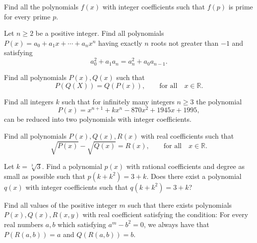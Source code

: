 \documentclass[12pt,a4paper]{memoir}
\theoremstyle{definition}
\begin{document}
\begin{question}
	Find all the polynomials $f(x)$ with integer coefficients such that $f(p)$ is prime for every prime $p.$
\end{question}





\begin{question}
	Let $ n \geq 2$ be a positive integer. Find all polynomials $ P(x)=a_0 +a_1 x +\cdots + a_{n} x^n$ having exactly $ n$ roots not greater than $-1$ and satisfying
	\[ a^2_0+ a_1 a_n = a^2_n +a_0 a_{n-1}.\]
\end{question}





\begin{question}
	Find all polynomials  $ P(x),Q(x)$ such that
	\[P(Q(X))=Q(P(x)), \qquad \text{for all} \quad  x \in \mathbb R.\]
\end{question}





\begin{question}
	Find all integers $ k$ such that for infinitely many integers $ n \ge 3$ the polynomial
	\[ P(x) =x^{n+ 1}+ kx^n - 870x^2 + 1945x + 1995,\]
	can be reduced into two polynomials with integer coefficients.
\end{question}





\begin{question}
	Find all polynomials $ P(x),Q(x),R(x)$ with real coefficients such that
	\[\sqrt{P(x)}-\sqrt{Q(x)}=R(x), \qquad \text{for all} \quad  x \in \mathbb R.\]
\end{question}





\begin{question}
	Let $k = \sqrt[3]{3}$. Find a polynomial $p(x)$ with rational coefficients and degree as small as possible such that $p(k+k^{2}) = 3+k$. Does there exist a polynomial $q(x)$ with integer coefficients such that $q(k+k^{2}) = 3+k$?
\end{question}





\begin{question}
	Find all values of the positive integer $ m$ such that there exists polynomials $ P(x),Q(x),R(x,y)$ with real coefficient satisfying the condition: For every real numbers $ a,b$ which satisfying $ a^m-b^2=0$, we always have that $ P(R(a,b))=a$ and $ Q(R(a,b))=b$.
\end{question}
\end{document}
